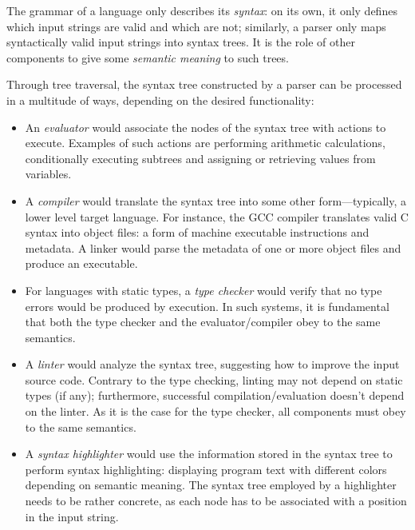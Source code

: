 \documentclass[UdineBachThesis,american,11pt]{PhdThesis}
\begin{document}
  The grammar of a language only describes its \emph{syntax}: on its own, it
  only defines which input strings are valid and which are not; similarly, a
  parser only maps syntactically valid input strings into syntax trees. It is
  the role of other components to give some \emph{semantic meaning} to such
  trees.

  Through tree traversal, the syntax tree constructed by a parser can be
  processed in a multitude of ways, depending on the desired functionality:

  \begin{itemize}
    \item An \emph{evaluator} would associate the nodes of the syntax tree with
    actions to execute. Examples of such actions are performing arithmetic
    calculations, conditionally executing subtrees and assigning or retrieving
    values from variables.

    \item A \emph{compiler} would translate the syntax tree into some other
    form---typically, a lower level target language. For instance, the GCC
    compiler translates valid C syntax into object files: a form of machine
    executable instructions and metadata. A linker would parse the metadata of
    one or more object files and produce an executable.

    \item For languages with static types, a \emph{type checker} would verify
    that no type errors would be produced by execution. In such systems, it is
    fundamental that both the type checker and the evaluator/compiler obey to
    the same semantics.

    \item A \emph{linter} would analyze the syntax tree, suggesting how to
    improve the input source code. Contrary to the type checking, linting may
    not depend on static types (if any); furthermore, successful
    compilation/evaluation doesn't depend on the linter. As it is the case for
    the type checker, all components must obey to the same semantics.

    \item A \emph{syntax highlighter} would use the information stored in the
    syntax tree to perform syntax highlighting: displaying program text with
    different colors depending on semantic meaning. The syntax tree employed by
    a highlighter needs to be rather concrete, as each node has to be associated
    with a position in the input string.
  \end{itemize}
\end{document}

